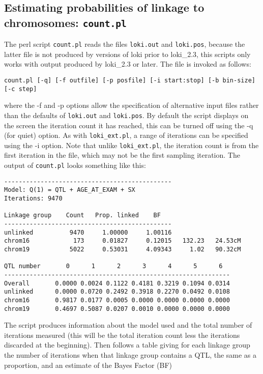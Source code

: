 \documentclass[10pt,a4paper]{article}
\begin{document}
\subsection{Estimating probabilities of linkage to chromosomes: \texttt{count.pl}}
\label{ref_count}
The perl script \verb+count.pl+ reads the files \verb+loki.out+ and
\verb+loki.pos+, because the latter file is not produced by versions of loki
prior to loki\_2.3, this scripts only works with output produced by
loki\_2.3 or later.  The file is invoked as follows:
\begin{verbatim}
count.pl [-q] [-f outfile] [-p posfile] [-i start:stop] [-b bin-size] [-c step]
\end{verbatim}
where the -f and -p options allow the specification of
alternative input files rather than the defaults of \verb+loki.out+ and
\verb+loki.pos+.  By default the script displays on the screen the iteration count it has
reached, this can be turned off using the -q (for quiet) option.
As with \verb+loki_ext.pl+, a range of iterations can be
specified using the -i option.  Note that unlike \verb+loki_ext.pl+, the
iteration count is from the first iteration in the file, which may not be
the first sampling iteration.  The output of \verb+count.pl+ looks something
like this:
\begin{verbatim}
----------------------------------------------
Model: Q(1) = QTL + AGE_AT_EXAM + SX
Iterations: 9470

Linkage group    Count   Prop. linked    BF
----------------------------------------------
unlinked          9470     1.00000     1.00116
chrom16            173     0.01827     0.12015   132.23   24.53cM
chrom19           5022     0.53031     4.09343     1.02   90.32cM

QTL number       0      1      2      3      4      5      6
--------------------------------------------------------------
Overall       0.0000 0.0024 0.1122 0.4181 0.3219 0.1094 0.0314
unlinked      0.0000 0.0720 0.2492 0.3918 0.2270 0.0492 0.0108
chrom16       0.9817 0.0177 0.0005 0.0000 0.0000 0.0000 0.0000
chrom19       0.4697 0.5087 0.0207 0.0010 0.0000 0.0000 0.0000
\end{verbatim}
The script produces information about the model used and the total number of
iterations measured (this will be the total iteration count less the
iterations discarded at the beginning).  Then follows a table giving for
each linkage group the number of iterations when that linkage group contains
a QTL, the same as a proportion, and an estimate of the Bayes Factor (BF)
\end{document}
